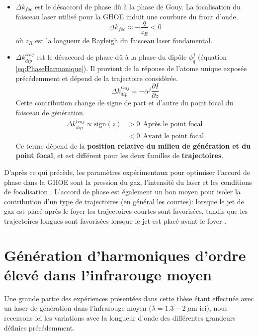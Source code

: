 \begin{itemize}
\item $\Delta k_{foc}$ est le désaccord de phase dû à la phase de Gouy. La focalisation du faisceau laser utilisé pour la GHOE induit une courbure du front d'onde.
\begin{equation}
\Delta k_{foc} \approx -\frac{q}{z_R} < 0
\end{equation}
où $z_R$ est la longueur de Rayleigh du faisceau laser fondamental.
\item $\Delta k_{dip}^{traj}$ est le désaccord de phase dû à la phase du dipôle $\phi_q^j$ (équation \ref{eq:PhaseHarmonique}). Il provient de la réponse de l'atome unique exposée précédemment et dépend de la trajectoire considérée.
\begin{equation}
\Delta k_{dip}^{traj} = - \alpha^j \frac{\partial I}{\partial z}
\end{equation}
Cette contribution change de signe de part et d'autre du point focal du faisceau de génération.
\begin{align}
\Delta k_{dip}^{traj} \propto \text{sign}(z) & > 0 \: \: \text{Après le point focal} \\
& < 0 \: \: \text{Avant le point focal}
\end{align}
Ce terme dépend de la \textbf{position relative du milieu de génération et du point focal}, et est différent pour les deux familles de  \textbf{trajectoires}.
\end{itemize}

D'après ce qui précède, les paramètres expérimentaux pour optimiser l'accord de phase dans la GHOE sont la pression du gaz, l'intensité du laser et les conditions de focalisation . L'accord de phase est également un bon moyen pour isoler la contribution d'un type de trajectoires (en général les courtes): lorsque le jet de gaz est placé après le foyer les trajectoires courtes sont favorisées, tandis que les trajectoires longues sont favorisées lorsque le jet est placé avant le foyer .




\section{Génération d'harmoniques d'ordre élevé dans l'infrarouge moyen}
Une grande partie des expériences présentées dans cette thèse étant effectuée avec un laser de génération dans l'infrarouge moyen ($\lambda = 1.3 - 2 \: \mu$m ici), nous recensons ici les variations avec la longueur d'onde des différentes grandeurs définies précédemment.

